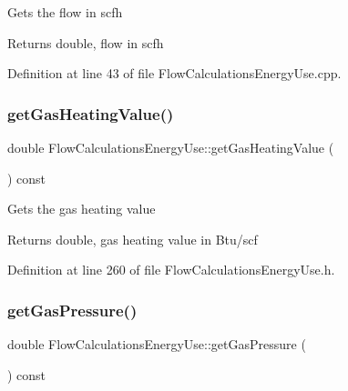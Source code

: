 Gets the flow in scfh

\begin{DoxyReturn}{Returns}
double, flow in scfh 
\end{DoxyReturn}


Definition at line 43 of file Flow\+Calculations\+Energy\+Use.\+cpp.

\mbox{\label{class_flow_calculations_energy_use_a42818c3f03cc70967eb6bb24094530a1}} 
\subsubsection{\texorpdfstring{get\+Gas\+Heating\+Value()}{getGasHeatingValue()}}
{\footnotesize\ttfamily double Flow\+Calculations\+Energy\+Use\+::get\+Gas\+Heating\+Value (\begin{DoxyParamCaption}{ }\end{DoxyParamCaption}) const\hspace{0.3cm}{\ttfamily [inline]}}

Gets the gas heating value

\begin{DoxyReturn}{Returns}
double, gas heating value in Btu/scf 
\end{DoxyReturn}


Definition at line 260 of file Flow\+Calculations\+Energy\+Use.\+h.

\mbox{\label{class_flow_calculations_energy_use_af98e97bce88915e6fdd7a0caf837049c}} 
\subsubsection{\texorpdfstring{get\+Gas\+Pressure()}{getGasPressure()}}
{\footnotesize\ttfamily double Flow\+Calculations\+Energy\+Use\+::get\+Gas\+Pressure (\begin{DoxyParamCaption}{ }\end{DoxyParamCaption}) const\hspace{0.3cm}{\ttfamily [inline]}}

